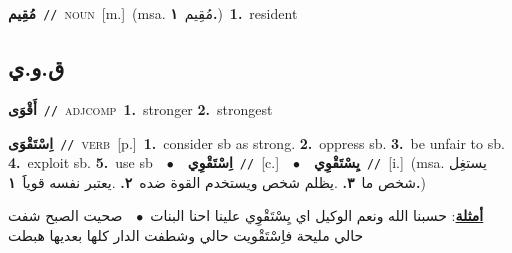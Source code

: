 \documentclass[10pt,a4paper,twoside]{article} %
\begin{document}
\begin{multicols}{2}
{\setlength\topsep{0pt}\textbf{\foreignlanguage{arabic}{مُقِيم}}\ {\color{gray}\texttt{//}\color{black}}\ \textsc{noun}\ [m.]\ \color{gray}(msa. \foreignlanguage{arabic}{مُقِيم}~\foreignlanguage{arabic}{\textbf{١.}})\color{black}\ \textbf{1.}~resident\ } \vspace{2mm}

\vspace{-3mm}
\subsection*{\color{blue}\foreignlanguage{arabic}{ق.و.ي}\color{blue}{}} 

{\setlength\topsep{0pt}\textbf{\foreignlanguage{arabic}{أَقْوَى}}\ {\color{gray}\texttt{//}\color{black}}\ \textsc{adj\textunderscore comp}\ \textbf{1.}~stronger  \textbf{2.}~strongest\ } \vspace{2mm}

{\setlength\topsep{0pt}\textbf{\foreignlanguage{arabic}{اِسْتَقْوَى}}\ {\color{gray}\texttt{//}\color{black}}\ \textsc{verb}\ [p.]\ \textbf{1.}~consider sb as strong.  \textbf{2.}~oppress sb.  \textbf{3.}~be unfair to sb.  \textbf{4.}~exploit sb.  \textbf{5.}~use sb\ \ $\bullet$\ \ \setlength\topsep{0pt}\textbf{\foreignlanguage{arabic}{اِسْتَقْوِي}}\ {\color{gray}\texttt{//}\color{black}}\ [c.]\ \ $\bullet$\ \ \setlength\topsep{0pt}\textbf{\foreignlanguage{arabic}{يِسْتَقْوِي}}\ {\color{gray}\texttt{//}\color{black}}\ [i.]\ \color{gray}(msa. \foreignlanguage{arabic}{يستغِل شخص ما}~\foreignlanguage{arabic}{\textbf{٣.}}  .\foreignlanguage{arabic}{يظلم شخص ويستخدم القوة ضده}~\foreignlanguage{arabic}{\textbf{٢.}}  .\foreignlanguage{arabic}{يعتبر نفسه قوياََ}~\foreignlanguage{arabic}{\textbf{١.}})\color{black}\  \begin{flushright}\color{gray}\foreignlanguage{arabic}{\textbf{\underline{\foreignlanguage{arabic}{أمثلة}}}: حسبنا الله ونعم الوكيل اي يِسْتَقْوِي علينا احنا البنات\ $\bullet$\ \  صحيت الصبح شفت حالي مليحة فاِسْتَقْويت حالي وشطفت الدار كلها بعديها هبطت}\end{flushright}\color{black}} \vspace{2mm}


\end{multicols}
\end{document}
